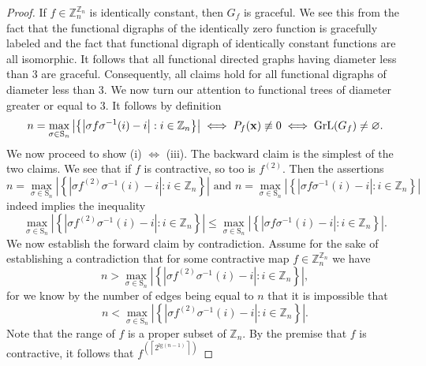 \begin{proof}
If $f\in\mathbb{Z}_{n}^{\mathbb{Z}_{n}}$ is identically constant,
then $G_{f}$ is graceful. We see this from the fact that the functional
digraphs of the identically zero function is gracefully labeled and the fact that
functional digraph of identically constant functions are all isomorphic. It follows
that all functional directed graphs having diameter less than $3$ are graceful. Consequently,
all claims hold for all functional digraphs of diameter less than $3$. We now turn our attention
to functional trees of diameter greater or equal to $3$. 
It follows by definition 
\begin{equation}
n=\max_{\sigma\in\text{S}_{n}}\left|\left\{ \left|\sigma f\sigma^{-1}(i)-i\right|:i\in\mathbb{Z}_{n}\right\} \right| \iff P_{f}({\bf x})\not\equiv0 \iff \text{GrL}(G_f) \neq \varnothing.
\end{equation}
We now proceed to show (i) $\iff$ (iii). The backward claim is the simplest of the two claims. We see
that if $f$ is contractive, so too is $f^{(2)}$. Then the
assertions
\begin{equation}
n=\max_{\sigma\in\text{S}_{n}}\left|\left\{ |\sigma f^{(2)}\sigma^{-1}(i)-i|:i\in\mathbb{Z}_{n}\right\} \right| \text{ and } n=\max_{\sigma\in\text{S}_{n}}\left|\left\{ |\sigma f\sigma^{-1}(i)-i|:i\in\mathbb{Z}_{n}\right\} \right|
\end{equation}
indeed implies the inequality
\begin{equation}
\max_{\sigma\in\text{S}_{n}}\left|\left\{ |\sigma f^{(2)}\sigma^{-1}(i)-i|:i\in\mathbb{Z}_{n}\right\} \right|\le\max_{\sigma\in\text{S}_{n}}\left|\left\{ |\sigma f\sigma^{-1}(i)-i|:i\in\mathbb{Z}_{n}\right\} \right|.
\end{equation}
We now establish the forward claim by contradiction. Assume for the
sake of establishing a contradiction that for some contractive map
$f\in\mathbb{Z}_{n}^{\mathbb{Z}_{n}}$ we have 
\begin{equation}
n>\max_{\sigma\in\text{S}_{n}}\left|\left\{ |\sigma f^{(2)}\sigma^{-1}(i)-i|:i\in\mathbb{Z}_{n}\right\} \right|,
\end{equation}
for we know by the number of edges being equal to $n$ that it is impossible
 that 
\begin{equation}
n<\max_{\sigma\in\text{S}_{n}}\left|\left\{ |\sigma f^{(2)}\sigma^{-1}(i)-i|:i\in\mathbb{Z}_{n}\right\} \right|.
\end{equation}
Note that the range of $f$ is a proper subset of $\mathbb{Z}_{n}$.
By the premise that $f$ is contractive, it follows that $f^{(\left\lceil 2^{\text{lg}(n-1)}\right\rceil )}$

\end{proof}
